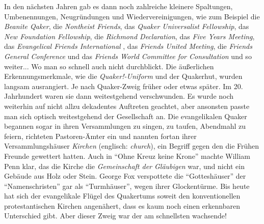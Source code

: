 In den nächsten Jahren gab es dann noch zahlreiche kleinere Spaltungen,
Umbenennungen, Neugründungen und Wiedervereinigungen, wie zum Beispiel die
\textit{Beanite Qaker}, die \textit{Nontheist
Friends}, das \textit{Quaker Universalist
Fellowship}, das \textit{New
Foundation Fellowship}, die
\textit{Richmond Declaration}, das \textit{Five
Years Meeting}, das \textit{Evangelical Friends International}
, das \textit{Friends United
Meeting}, die \textit{Friends General
Conference} und das \textit{Friends
World Committee for Consultation} und so weiter... Wo man so schnell auch nicht
durchblickt.
Die äußerlichen Erkennungsmerkmale, wie die \textit{Quaker!-Uniform}
 und der Quakerhut, wurden
langsam ausrangiert. Je nach Quaker-Zweig früher oder etwas später. Im 20.
Jahrhundert waren sie dann weitestgehend verschwunden. Es wurde noch weiterhin
auf
nicht allzu dekadentes Auftreten geachtet, aber ansonsten passte man sich
optisch weitestgehend der Gesellschaft an. Die evangelikalen Quaker begannen
sogar in ihren Versammlungen zu singen, zu taufen, Abendmahl zu feiern,
richteten Pastoren-Ämter ein und nannten
fortan ihrer Versammlungshäuser \textit{Kirchen}
(englisch: \textit{church}),
ein Begriff gegen den die Frühen Freunde gewettert hatten. Auch in "`Ohne Kreuz
keine Krone"' machte William Penn klar, das die Kirche die \textit{Gemeinschaft
der
Gläubigen} war, und nicht ein Gebäude aus Holz oder Stein. George Fox
verspottete
die "`Gotteshäuser"' der "`Namenschristen"' gar als
"`Turmhäuser"', wegen ihrer
Glockentürme. Bis heute hat sich der evangelikale Flügel des Quakertums soweit
den konventionellen protestantischen Kirchen angenähert, dass es kaum noch
einen
erkennbaren Unterschied gibt. Aber dieser Zweig war der am schnellsten
wachsende!

\medskip

